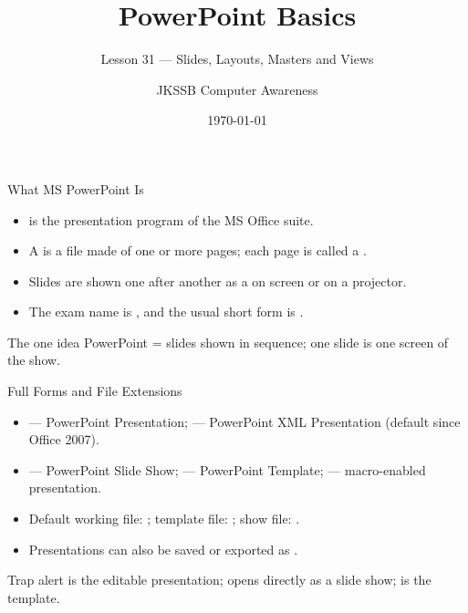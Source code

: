 \documentclass[aspectratio=169]{beamer}
\title{PowerPoint Basics}
\subtitle{Lesson 31 --- Slides, Layouts, Masters and Views}
\author{JKSSB Computer Awareness}
\date{\today}
\begin{document}
\frame{\titlepage}

\begin{frame}{What MS PowerPoint Is}
  \begin{itemize}
    \item {} is the presentation program of the MS Office suite.
    \item A  is a file made of one or more pages; each page
      is called a .
    \item Slides are shown one after another as a  on screen
      or on a projector.
    \item The exam name is , and the usual short
      form is .
  \end{itemize}
  \begin{block}{The one idea}
    PowerPoint = slides shown in sequence; one slide is one screen of the show.
  \end{block}
\end{frame}

\begin{frame}{Full Forms and File Extensions}
  \begin{itemize}
    \item {} --- PowerPoint Presentation;  --- PowerPoint XML
      Presentation (default since Office 2007).
    \item {} --- PowerPoint Slide Show;  --- PowerPoint
      Template;  --- macro-enabled presentation.
    \item Default working file: ; template file: ;
      show file: .
    \item Presentations can also be saved or exported as .
  \end{itemize}
  \begin{alertblock}{Trap alert}
     is the editable presentation;  opens directly as a
    slide show;  is the template.
  \end{alertblock}
\end{frame}
\end{document}

